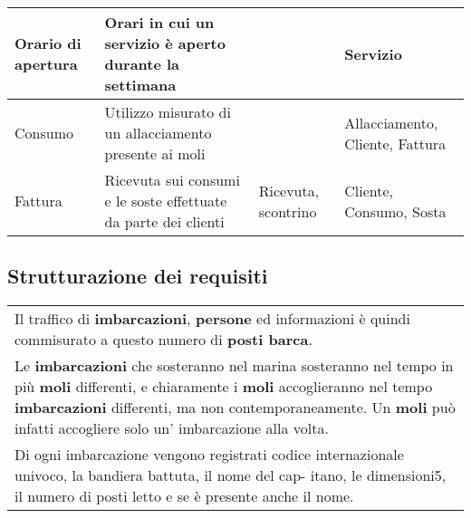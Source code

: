\begin{center}
\begin{tabularx}{\textwidth}{|>{\RaggedRight}p{2cm}|p{7cm}|p{2.4cm}|>{\RaggedRight}X|}
        \hline
        Orario di apertura & Orari in cui un servizio è aperto durante la settimana & & Servizio\\

        \hline
        Consumo & Utilizzo misurato di un allacciamento presente ai moli & & Allacciamento, Cliente, Fattura \\
       
        \hline
        Fattura & Ricevuta sui consumi e le soste effettuate da parte dei clienti & Ricevuta, scontrino & Cliente, Consumo, Sosta\\
        
        \hline
    \end{tabularx}
\end{center}

\subsection{Strutturazione dei requisiti}

\begin{center}
    \begin{tabularx}{\textwidth}{|X|}
        \hline
        \rowcolor{gray!30}
        \multicolumn{1}{|c|}{\textbf{Frasi relative a Imbarcazione}}\\
        \hline
        Il traffico di \textbf{imbarcazioni}, \textbf{persone} ed informazioni è quindi commisurato a questo numero di \textbf{posti barca}. \\

        Le \textbf{imbarcazioni} che sosteranno nel marina sosteranno nel tempo in più \textbf{moli} differenti, e chiaramente i \textbf{moli} accoglieranno nel tempo \textbf{imbarcazioni} differenti, ma non contemporaneamente. Un \textbf{moli} può infatti accogliere solo un’ imbarcazione alla volta. \\

        Di ogni imbarcazione vengono registrati codice internazionale univoco, la bandiera battuta, il nome del cap- itano, le dimensioni5, il numero di posti letto e se è presente anche il nome.\\
        \hline
    \end{tabularx}
\end{center}

